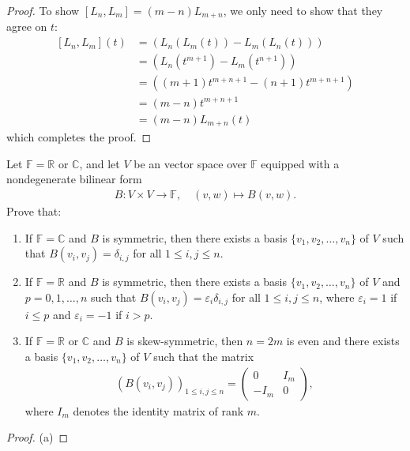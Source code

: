 \documentclass[../main.tex]{subfiles}
\begin{document}
\begin{proof}
     To show \(  \left[ L_{n},L_{m} \right]= \left( m-n \right)L_{m+ n}    \), we only need to show that they agree on \(  t  \): \[
     \begin{aligned}
      \left[ L_{n},L_{m} \right]\left( t \right)&=  \left( L_{n} \left( L_{m}\left( t \right)  \right)-L_{m}\left( L_{n}\left( t \right)  \right)   \right)\\ 
       &=    \left( L_{n}\left( t^{m+ 1} \right)-L_{m}\left( t^{n+ 1} \right)   \right)\\ 
        &= \left( \left( m+ 1 \right)t^{m+ n+ 1}  -  \left( n+ 1 \right)t^{m+ n+ 1} \right)\\ 
         &= \left( m-n \right) t^{m+ n+ 1}\\ 
          &= \left( m-n \right)L_{m+ n}\left( t \right)     
     \end{aligned}
     \]   which completes the proof.

    
\end{proof}

\begin{exercise}{}{}
Let $\mathbb{F} = \mathbb{R}$ or $\mathbb{C}$, and let $V$ be an  vector space over $\mathbb{F}$ equipped with a nondegenerate bilinear form
\[\begin{aligned}
B: V \times V \to \mathbb{F}, \quad (v,w) \mapsto B(v,w).
\end{aligned}\]
Prove that:
\begin{enumerate}
\item[(a)] If $\mathbb{F} = \mathbb{C}$ and $B$ is symmetric, then there exists a basis $\{v_1, v_2, \dots, v_n\}$ of $V$ such that $B(v_i, v_j) = \delta_{i,j}$ for all $1 \le i, j \le n$.
\item[(b)] If $\mathbb{F} = \mathbb{R}$ and $B$ is symmetric, then there exists a basis $\{v_1, v_2, \dots, v_n\}$ of $V$ and $p=0, 1, \dots, n$ such that $B(v_i, v_j) = \varepsilon_i \delta_{i,j}$ for all $1 \le i, j \le n$, where $\varepsilon_i = 1$ if $i \le p$ and $\varepsilon_i = -1$ if $i > p$.
\item[(c)] If $\mathbb{F} = \mathbb{R}$ or $\mathbb{C}$ and $B$ is skew-symmetric, then $n=2m$ is even and there exists a basis $\{v_1, v_2, \dots, v_n\}$ of $V$ such that the matrix
\[\begin{aligned}
(B(v_i, v_j))_{1 \le i, j \le n} = \begin{pmatrix} 0 & I_m \\ -I_m & 0 \end{pmatrix},
\end{aligned}\]
where $I_m$ denotes the identity matrix of rank $m$.
\end{enumerate}
\end{exercise}

\begin{proof}
    \item (a) 
\end{proof}
\end{document}

